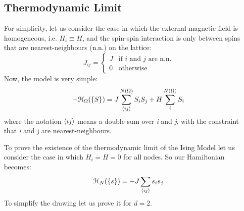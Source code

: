 \documentclass[../../Main/Main.tex]{subfiles}
\begin{document}

\subsection{Thermodynamic Limit}

For simplicity, let us consider the case in which the external magnetic field is homogeneous, i.e. \( H_i \equiv H \), and the spin-spin interaction is only between spins that are nearest-neighbours (n.n.) on the lattice:
\begin{equation}
J_{ij} =
  \begin{cases}
  J & \text{if } i \text{ and } j \text{ are n.n.} \\
  0 & \text{otherwise}
  \end{cases}
\end{equation}
Now, the model is very simple:
\begin{equation}
  - \mathcal{H}_ \Omega ( \{ S \}  ) = J \sum_{\expval{ij} }^{N (\Omega )} S_i S_j + H \sum_{i}^{N(\Omega )} S_i
  \label{eq:6_0}
\end{equation}
where the notation \( \expval{ij}  \) means a double sum over \emph{i} and \emph{j}, with the constraint that \emph{i} and \emph{j} are nearest-neighbours.

To prove the existence of the thermodynamic limit of the Ising Model let us consider the case in which $H_{i} = H = 0$ for all nodes.
So our Hamiltonian becomes:
$$\mathcal{H}_{N}(\{ s \}) = -J \sum_{{\left< {ij} \right>}} s_{i}s_{j}$$
To simplify the drawing let us prove it for $d=2$.
\end{document}
